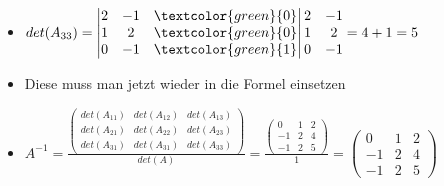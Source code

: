 \documentclass{article}
\begin{document}
\begin{itemize}
\begin{itemize}
\begin{itemize}
				\item{$det(A_{33})=\begin{vmatrix} 2 & -1 & \textcolor{green}{0} \\ 1 & 2 & \textcolor{green}{0} \\ 0 & -1 & \textcolor{green}{1} \end{vmatrix}\begin{matrix} 2 & -1 \\ 1 & 2 \\ 0 & -1 \end{matrix}=4+1=5$}
				\item{Diese muss man jetzt wieder in die Formel einsetzen}
				\item{$A^{-1}=\frac{\begin{pmatrix} det(A_{11}) & det(A_{12}) & det(A_{13}) \\ det(A_{21}) & det(A_{22}) & det(A_{23}) \\ det(A_{31}) & det(A_{31}) & det(A_{33})\end{pmatrix}}{det(A)}=\frac{\begin{pmatrix} 0 & 1 & 2 \\ -1 & 2 & 4 \\ -1 & 2 & 5 \end{pmatrix}}{1}=\begin{pmatrix} 0 & 1 & 2 \\ -1 & 2 & 4 \\ -1 & 2 & 5 \end{pmatrix}$}
			\end{itemize}
		\end{itemize}
	\end{itemize}




	

	























  
\end{document}
